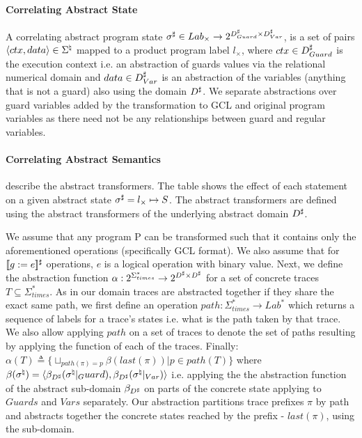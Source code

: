\paragraph{Correlating Abstract State} 
A correlating abstract program state $\sigma^\sharp \in Lab_{\times} \rightarrow 2^{D^\sharp_{Guard} \times D^\sharp_{Var}}$, is a set of pairs $\langle ctx, data \rangle \in \Sigma^\natural$ mapped to a product program label $l_{\times}$, where $ctx \in D^\sharp_{Guard}$ is the execution context i.e. an abstraction of guards values via the relational numerical domain and $data \in D^\sharp_{Var}$ is an abstraction of the variables (anything that is not a guard) also using the domain $D^\sharp$. We separate abstractions over guard variables added by the transformation to GCL and original program variables as there need not be any relationships between guard and regular variables.



\paragraph{Correlating Abstract Semantics} 
 describe the abstract transformers. The table shows the effect of each statement on a given abstract state $\sigma^\sharp = l_{\times} \mapsto S$. The abstract transformers are defined using the abstract transformers of the underlying abstract domain $D^\sharp$.

We assume that any program P can be transformed such that it contains only the aforementioned operations (specifically GCL format). We also assume that for $\lbrack\!\lbrack g:=e \rbrack\!\rbrack^{\sharp}$ operations, $e$ is a logical operation with binary value.
Next, we define the abstraction function $\alpha : 2^{\Sigma^{*}_{times}} \rightarrow 2^{D^\sharp \times D^\sharp}$ for a set of concrete traces $T \subseteq \Sigma^{*}_{times}$. As in our domain traces are abstracted together if they share the exact same path, we first define an operation $path : \Sigma^{*}_{times} \rightarrow Lab^{*}$ which returns a sequence of labels for a trace's states i.e. what is the path taken by that trace. We also allow applying $path$ on a set of traces to denote the set of paths resulting by applying the function of each of the traces. Finally: $\alpha(T) \triangleq \{ \sqcup_{path(\pi)=p} \beta(last(\pi)) | p \in path(T) \}$ where $\beta(\sigma^\natural) = \langle \beta_{D^\sharp}(\sigma^\natural|_Guard), \beta_{D^\sharp}(\sigma^\natural|_{Var}) \rangle$  i.e. applying the the abstraction function of the abstract sub-domain $\beta_{D^\sharp}$ on parts of the concrete state applying to $Guards$ and $Vars$ separately. Our abstraction partitions trace prefixes $\pi$ by path and abstracts together the concrete states reached by the prefix - $last(\pi)$, using the sub-domain.


